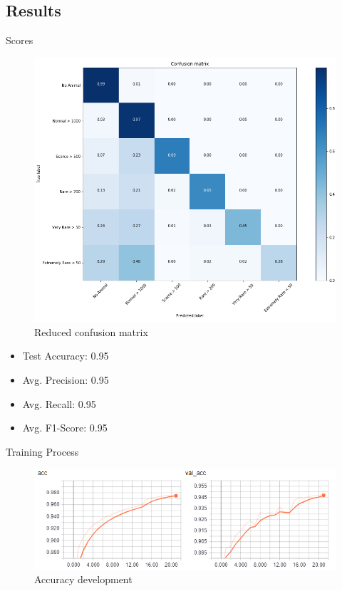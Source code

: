 \documentclass[10pt]{beamer}
\begin{document}
\subsection{Results}

\begin{frame}{Scores}
	\centering
	\begin{minipage}[c]{0.58\linewidth}
		\begin{figure}
			\includegraphics[width=\columnwidth]{images/conf_mat_simple.png}
			\caption{Reduced confusion matrix}
		\end{figure}
	\end{minipage}
	\begin{minipage}[c]{0.38\linewidth}
		\begin{itemize}
			\item Test Accuracy: 0.95
			\item Avg. Precision:  0.95
			\item Avg. Recall: 0.95
			\item Avg. F1-Score: 0.95
		\end{itemize}
	\end{minipage}
\end{frame}


\begin{frame}{Training Process}
	\centering
	\begin{figure}
		\includegraphics[width=.9\columnwidth,height=\textheight,keepaspectratio]{images/acc.png}
		\caption{Accuracy development}
	\end{figure}
\end{frame}
\end{document}
